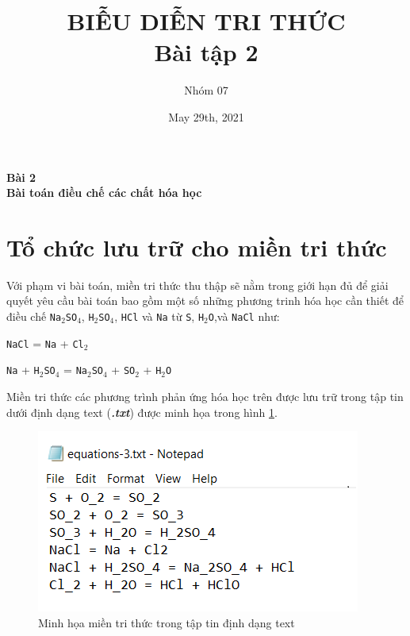 \documentclass[a4paper]{article}
\title{BIỄU DIỄN TRI THỨC\\ Bài tập 2}
\author{Nhóm 07}
\date{May 29th, 2021}
\begin{document}
	\maketitle
	\begin{center}
		\LARGE{\textbf{Bài 2\\Bài toán điều chế các chất hóa học}}
	\end{center}
	
	\section{Tổ chức lưu trữ cho miền tri thức} 	
	
	Với phạm vi bài toán, miền tri thức thu thập sẽ nằm trong giới hạn đủ để giải quyết yêu cầu bài toán bao gồm một số những phương trinh hóa học cần thiết để điều chế \texttt{Na$_2$SO$_4$}, \texttt{H$_2$SO$_4$}, \texttt{HCl} và \texttt{Na} từ \texttt{S}, \texttt{H$_2$O},và \texttt{NaCl} như:
	
	\texttt{NaCl} = \texttt{Na} + \texttt{Cl$_2$}  
	
	\texttt{Na} + \texttt{H$_2$SO$_4$} = \texttt{Na$_2$SO$_4$} + \texttt{SO$_2$} + \texttt{H$_2$O}
	
	Miền tri thức các phương trình phản ứng hóa học trên được lưu trữ trong tập tin dưới định dạng text (\textbf{\textit{.txt}}) được minh họa trong hình \ref{fig-2a:mien-tri-thuc}. 
	\begin{figure}[h]
		\centering
		\includegraphics[width=0.7\linewidth]{images/2a_mien-tri-thuc}
		\caption{Minh họa miền tri thức trong tập tin định dạng text}
		\label{fig-2a:mien-tri-thuc}
	\end{figure}
	
\end{document}
